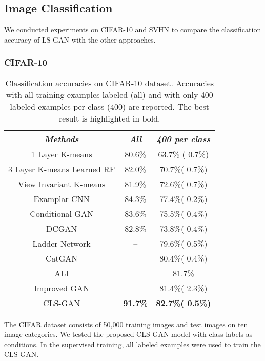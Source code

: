 \documentclass[11pt,fullpage, letterpaper,twoside]{article}
\newcommand{\1}[1]{\mathds{1}_{\left[#1\right]}}
\begin{document}
\subsection{Image Classification}
We conducted experiments on CIFAR-10 and SVHN to compare the classification accuracy of LS-GAN with the other approaches.



\subsubsection{CIFAR-10}



\begin{table}[]
\caption{Classification accuracies on CIFAR-10 dataset. Accuracies with all training examples labeled (all) and with only 400 labeled examples per class (400) are reported. The best result is highlighted in bold.
}
\label{tab:cifar10}
\begin{center}
\begin{tabular}{c||c|c}    \toprule
\emph{Methods} & \emph{All}& \emph{400 per class}   \\\midrule
1 Layer K-means \cite{radford2015unsupervised}& 80.6\% & 63.7\% ( 0.7\%) \\
3 Layer K-means Learned RF \cite{coates2011selecting}& 82.0\% & 70.7\%( 0.7\%)  \\
View Invariant K-means \cite{hui2013direct}& 81.9\% & 72.6\%( 0.7\%) \\
Examplar CNN \cite{dosovitskiydiscriminative}& 84.3\% & 77.4\%( 0.2\%) \\
Conditional GAN \cite{mirza2014conditional} & 83.6\% & 75.5\%( 0.4\%)\\
DCGAN \cite{radford2015unsupervised}& 82.8\% & 73.8\%( 0.4\%) \\
Ladder Network \cite{rasmus2015semi} &  -- & 79.6\%( 0.5\%)\\
CatGAN \cite{springenberg2015unsupervised} & -- & 80.4\%( 0.4\%) \\
ALI \cite{dumoulin2016adversarially} & -- & 81.7\%\\
Improved GAN \cite{salimans2016improved} & -- & 81.4\%( 2.3\%) \\\midrule
CLS-GAN & \bf 91.7\% & \bf 82.7\%( 0.5\%) \\\bottomrule
\end{tabular}
\end{center}
\end{table}

The CIFAR dataset \cite{krizhevsky2009learning} consists of 50,000 training images and  test images on ten image categories.
We tested the proposed CLS-GAN model with class labels as conditions.  In the supervised training, all labeled examples were used to train the CLS-GAN.
\end{document}
